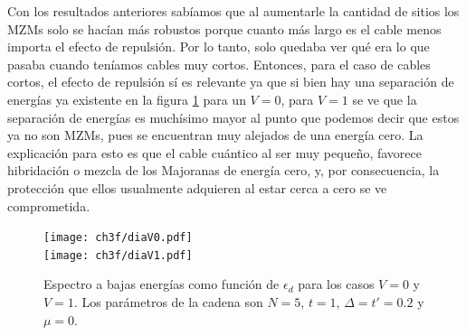 Con los resultados anteriores sab\'{i}amos que al aumentarle la cantidad de sitios los MZMs solo se hac\'{i}an m\'{a}s robustos porque cuanto m\'{a}s largo es el cable menos importa el efecto de repulsi\'{o}n. Por lo tanto, solo quedaba ver qu\'{e} era lo que pasaba cuando ten\'{i}amos cables muy cortos.
Entonces, para el caso de cables cortos, el efecto de repulsi\'{o}n s\'{i} es relevante ya que si bien hay una separaci\'{o}n de energ\'{i}as ya existente en la figura \ref{cortito} para un $V=0$, para $V=1$ se ve que la separaci\'{o}n de energ\'{i}as es much\'{i}simo mayor al punto que podemos decir que estos ya no son MZMs, pues se encuentran muy alejados de una energ\'{i}a cero. La explicaci\'{o}n para esto es que el cable cu\'{a}ntico al ser muy peque\~{n}o, favorece hibridaci\'{o}n o mezcla de los Majoranas de energ\'{i}a cero, y, por consecuencia, la protecci\'{o}n que ellos usualmente adquieren al estar cerca a cero se ve comprometida.
%
\begin{figure}[H]
\begin{center}
\texttt{[image: ch3f/diaV0.pdf]}\\
\vspace{-0.3cm}
\texttt{[image: ch3f/diaV1.pdf]}
\end{center}
\caption{Espectro a bajas energ\'{i}as como funci\'{o}n de $\epsilon_d$ para los casos $V=0$ y $V=1$. Los par\'{a}metros de la cadena son $N=5$, $t=1$, $\Delta=t'=0.2$ y $\mu=0$. }
\label{cortito}
\end{figure}%
